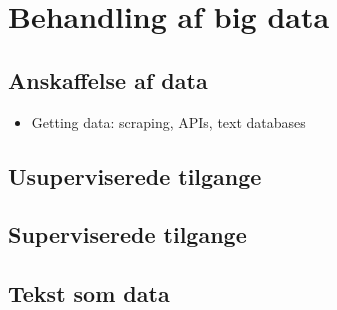 \documentclass[12pt,]{article}
\providecommand{\tightlist}{%
  \setlength{\itemsep}{0pt}\setlength{\parskip}{0pt}}
\begin{document}
\hypertarget{behandling-af-big-data}{%
\section{Behandling af big data}\label{behandling-af-big-data}}

\hypertarget{anskaffelse-af-data}{%
\subsection{Anskaffelse af data}\label{anskaffelse-af-data}}

\begin{itemize}
\tightlist
\item
  Getting data: scraping, APIs, text databases
\end{itemize}

\hypertarget{usuperviserede-tilgange}{%
\subsection{Usuperviserede tilgange}\label{usuperviserede-tilgange}}

\hypertarget{superviserede-tilgange}{%
\subsection{Superviserede tilgange}\label{superviserede-tilgange}}

\hypertarget{tekst-som-data}{%
\subsection{Tekst som data}\label{tekst-som-data}}
\end{document}
